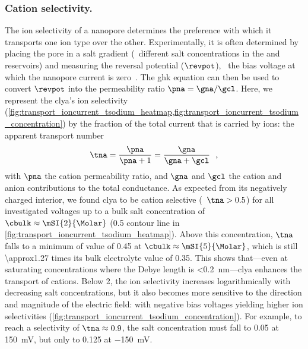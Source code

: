 \subsubsection{Cation selectivity.}
%
The ion selectivity of a nanopore determines the preference with which it transports one ion type over the
other. Experimentally, it is often determined by placing the pore in a salt gradient (\ie~different salt
concentrations in the \cisi{} and \transi{} reservoirs) and measuring the reversal potential ($\revpot$),
\ie~the bias voltage at which the nanopore current is zero~\cite{Soskine-2013,Franceschini-2016}. The
\gls{ghk} equation can then be used to convert $\revpot$ into the permeability ratio $\pna = \gna / \gcl$.
Here, we represent the \gls{clya}'s ion selectivity
%
(\cref{fig:transport_ioncurrent_tsodium_heatmap,fig:transport_ioncurrent_tsodium_concentration}) 
%
by the fraction of the total current that is carried by \Na{} ions: the apparent \Na{} transport number
%
\begin{align}\label{eq:tna}
  \tna = \dfrac{\pna}{\pna + 1} = \dfrac{\gna}{\gna + \gcl}
  \text{\,\, ,}
\end{align}
%
with $\pna$ the cation permeability ratio, and $\gna$ and $\gcl$ the cation and anion contributions to the
total conductance. As expected from its negatively charged interior, we found \gls{clya} to be cation
selective (\ie~$\tna > 0.5$) for all investigated voltages up to a bulk salt concentration of $\cbulk \approx
\mSI{2}{\Molar}$  (0.5 contour line in \cref{fig:transport_ioncurrent_tsodium_heatmap}). Above this
concentration, $\tna$ falls to a minimum of value of 0.45 at $\cbulk\approx\mSI{5}{\Molar}$, which is still
\num{\approx1.27} times its bulk electrolyte value of 0.35. This shows that---even at saturating
concentrations where the Debye length is \SI{<0.2}{\nm}---\gls{clya} enhances the transport of cations. Below
\SI{2}{\Molar}, the ion selectivity increases logarithmically with decreasing salt concentrations, but it also
becomes more sensitive to the direction and magnitude of the electric field:  with negative bias voltages
yielding higher ion selectivities (\cref{fig:transport_ioncurrent_tsodium_concentration}). For example, to
reach a selectivity of $\tna \approx 0.9$, the salt concentration must fall to \SI{0.05}{\Molar} at
\SI{+150}{\mV}, but only to \SI{0.125}{\Molar} at \SI{-150}{\mV}.

